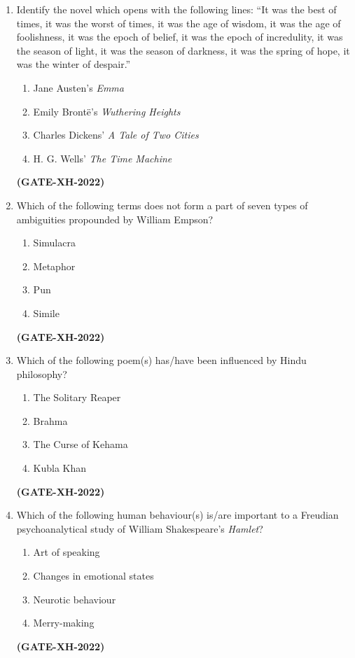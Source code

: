 \documentclass[journal]{IEEEtran}
\begin{document}
\begin{enumerate}
\item Identify the novel which opens with the following lines:  
``It was the best of times, it was the worst of times, it was the age of wisdom, it was the age of foolishness, it was the epoch of belief, it was the epoch of incredulity, it was the season of light, it was the season of darkness, it was the spring of hope, it was the winter of despair.''
\begin{multicols}{2}
\begin{enumerate}
\item Jane Austen’s \textit{Emma}
\item Emily Brontë’s \textit{Wuthering Heights}
\item Charles Dickens’ \textit{A Tale of Two Cities}
\item H. G. Wells’ \textit{The Time Machine}
\end{enumerate}
\end{multicols}
\hfill\textbf{(GATE-XH-2022)}

\item Which of the following terms does not form a part of seven types of ambiguities propounded by William Empson?
\begin{multicols}{4}
\begin{enumerate}
\item Simulacra
\item Metaphor
\item Pun
\item Simile
\end{enumerate}
\end{multicols}
\hfill\textbf{(GATE-XH-2022)}

\item Which of the following poem(s) has/have been influenced by Hindu philosophy?
\begin{multicols}{2}
\begin{enumerate}
\item The Solitary Reaper
\item Brahma
\item The Curse of Kehama
\item Kubla Khan
\end{enumerate}
\end{multicols}
\hfill\textbf{(GATE-XH-2022)}

\item Which of the following human behaviour(s) is/are important to a Freudian psychoanalytical study of William Shakespeare’s \textit{Hamlet}?
\begin{multicols}{2}
\begin{enumerate}
\item Art of speaking
\item Changes in emotional states
\item Neurotic behaviour
\item Merry-making
\end{enumerate}
\end{multicols}
\hfill\textbf{(GATE-XH-2022)}


\end{enumerate}
\end{document}
